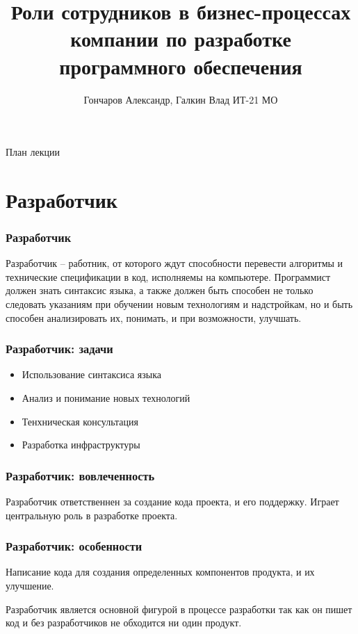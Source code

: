 \documentclass{../industrial-development}
\title{Роли сотрудников в бизнес-процессах компании по разработке программного обеспечения}
\author{Гончаров Александр, Галкин Влад ИТ-21 МО}
\date{}
\begin{document}
	
	\begin{frame}
		\titlepage
	\end{frame}
	
	\begin{frame}{План лекции}
		\tableofcontents
	\end{frame}
	
	
	\section{Разработчик }
	
	\begin{frame} \frametitle{Разработчик}
		\begin{block}{}
			\alert {}Разработчик – работник, от которого ждут способности перевести алгоритмы и технические спецификации в код, исполняемы на компьютере. Программист должен знать синтаксис языка, а также должен быть способен не только следовать указаниям при обучении новым технологиям и надстройкам, но и быть способен анализировать их, понимать, и при возможности, улучшать.
			
		\end{block}
		
	\end{frame}
	
	\begin{frame} \frametitle{Разработчик: задачи}
		\begin{itemize}
			\item Использование синтаксиса языка
			\item Анализ и понимание новых технологий
			\item Тенхническая консультация
			\item Разработка инфраструктуры
		\end{itemize}
	\end{frame}
	
	\begin{frame} \frametitle{Разработчик: вовлеченность}
		Разработчик ответственнен за создание кода проекта, и его поддержку. Играет центральную роль в разработке проекта.
	\end{frame}
	
	\begin{frame} \frametitle{Разработчик: особенности}
		Написание кода для создания определенных компонентов продукта, и их улучшение. 	
	\end{frame}

	\lecturenotes
		Разработчик является основной фигурой в процессе разработки так как он пишет код и без разработчиков не обходится ни один продукт. 
	
\end{document}
